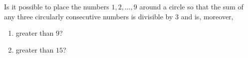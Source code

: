 Is it possible to place the numbers $1,2,\dots,9$ around a circle so that the sum of any three circularly consecutive numbers is divisible by $3$ and is, moreover,
\begin{enumerate}
\item[(a)] greater than $9$?
\item[(b)] greater than $15$?
\end{enumerate}
